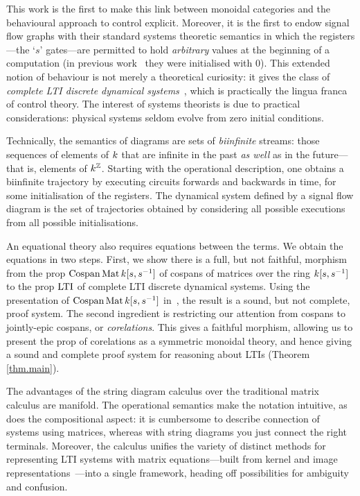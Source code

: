 This work is the first to make this link between monoidal categories and the
behavioural approach to control explicit. Moreover, it is the first to endow
signal flow graphs with their standard systems theoretic semantics in which the
registers---the `$s$' gates---are permitted to hold \emph{arbitrary} values at
the beginning of a computation (in previous work~\cite{BSZ1,BSZ3} they were
initialised with $0$).  This extended notion of behaviour is not merely a
theoretical curiosity: it gives the class of \emph{complete LTI discrete
dynamical systems}~\cite{Wi3}, which is practically the lingua franca of control
theory. The interest of systems theorists is due to practical considerations:
physical systems seldom evolve from zero initial conditions.

Technically, the semantics of diagrams are sets of \emph{biinfinite}
streams: those sequences of elements of $k$ that are infinite in the past
\emph{as well} as in the future---that is, elements of $k^{\mathbb Z}$.  Starting with
the operational description, one obtains a biinfinite trajectory by executing
circuits forwards and backwards in time, for some initialisation of the
registers. The dynamical system defined by a signal flow diagram is the set of
trajectories obtained by considering all possible executions from all possible initialisations.

An equational theory also requires equations between the terms. We obtain the
equations in two steps. First, we show there is a full, but not faithful,
morphism from the prop $\operatorname{{Cospan}}\operatorname{\mathrm{Mat}}{k[s,s^{-1}]}$ of cospans of matrices over the ring
${k[s,s^{-1}]}$ to the prop $\operatorname{\mathrm{LTI}}$ of complete LTI discrete dynamical systems.
Using the presentation of $\operatorname{{Cospan}}\operatorname{\mathrm{Mat}}{k[s,s^{-1}]}$ in~\cite{BSZ2,Za}, the result is a
sound, but not complete, proof system. The second ingredient is restricting our
attention from cospans to jointly-epic cospans, or \emph{corelations}. This
gives a faithful morphism, allowing us to present the prop of corelations as a
symmetric monoidal theory, and hence giving a sound and complete proof system for
reasoning about LTIs (Theorem \ref{thm.main}).

The advantages of the string diagram calculus over the traditional matrix
calculus are manifold. The operational semantics make the notation intuitive, as
does the compositional aspect: it is cumbersome to describe connection of
systems using matrices, whereas with string diagrams you just connect the right
terminals. Moreover, the calculus unifies the variety of distinct methods for representing
LTI systems with matrix equations---built from kernel and image
representations~\cite{Wi,Wi3}---into a single framework, heading off
possibilities for ambiguity and confusion.

